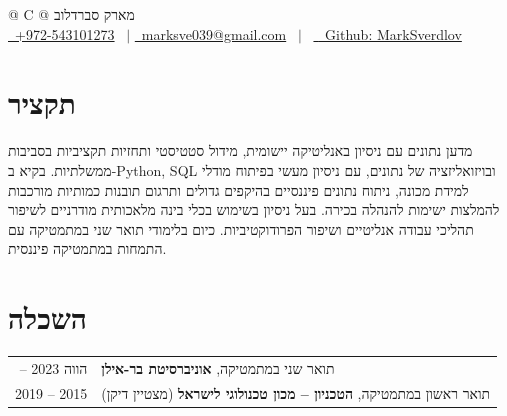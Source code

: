 \documentclass[a4paper,12pt]{article}
\begin{document}
\pagestyle{empty} 



\begin{tabularx}{\linewidth}{@{} C @{}}
\Huge{מארק סברדלוב} \\[7.5pt]
\href{tel:+972543101273}{\textenglish{\faMobile\, +972-543101273}} \ $|$
\href{mailto:marksve039@gmail.com}{\textenglish{\faEnvelope\, marksve039@gmail.com}} \ $|$ \
\href{https://github.com/MarkSverdlov}{ \textenglish{\faGithub\, Github: MarkSverdlov}} \ \\
\end{tabularx}



\section{תקציר}
מדען נתונים עם ניסיון באנליטיקה יישומית, מידול סטטיסטי ותחזיות תקציביות בסביבות ממשלתיות. בקיא ב-\textenglish{Python}‏, \textenglish{SQL} ובויזואליזציה של נתונים, עם ניסיון מעשי בפיתוח מודלי למידת מכונה, ניתוח נתונים פיננסיים בהיקפים גדולים ותרגום תובנות כמותיות מורכבות להמלצות ישימות להנהלה בכירה. בעל ניסיון בשימוש בכלי בינה מלאכותית מודרניים לשיפור תהליכי עבודה אנליטיים ושיפור הפרודוקטיביות. כיום בלימודי תואר שני במתמטיקה עם התמחות במתמטיקה פיננסית.

\section{השכלה}
\begin{tabularx}{\linewidth}{@{}r X@{}}
\textenglish{-- 2023} הווה & תואר שני במתמטיקה, \textbf{אוניברסיטת בר-אילן} \\
\textenglish{2019 -- 2015} & תואר ראשון במתמטיקה, \textbf{הטכניון – מכון טכנולוגי לישראל} (מצטיין דיקן)
\end{tabularx}
\end{document}

